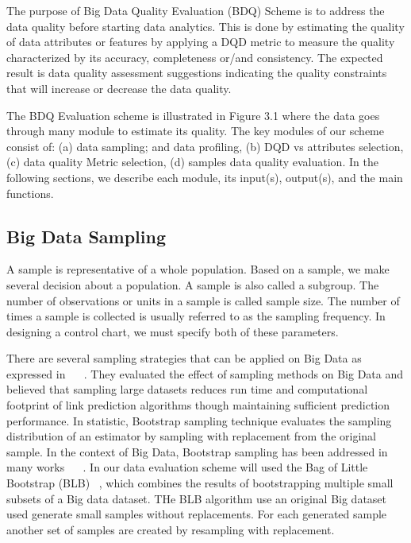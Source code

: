 The purpose of Big Data Quality Evaluation (BDQ) Scheme is to address the data quality before starting data analytics.
This is done by estimating the quality of data attributes or features by applying a DQD metric to measure the quality characterized by its
accuracy, completeness or/and consistency. The expected result is data quality assessment suggestions indicating the quality 
constraints that will increase or decrease the data quality.

The BDQ Evaluation scheme is illustrated in Figure 3.1 where the data goes through many module to estimate its quality.
The key modules of our scheme consist of: (a) data sampling; and data profiling, (b) DQD vs attributes selection, 
(c) data quality Metric selection, (d) samples data quality evaluation. In the following sections, we describe each module, its input(s), output(s),
and the main functions.

\subsection{Big Data Sampling}

A sample is representative of a whole population. Based on a sample, we make several decision about a population. 
A sample is also called a subgroup. The number of observations or units in a sample is called sample size. 
The number of times a sample is collected is usually referred to as the sampling frequency. In designing a control chart, we must 
specify both of these parameters. ~\cite{Jugulum14}

There are several sampling strategies that can be applied on Big Data as expressed in ~\cite{Asilomar} ~\cite{SIGKDD}.
They evaluated the effect of sampling methods on Big Data and believed that sampling large datasets reduces run time and computational footprint of link 
prediction algorithms though maintaining sufficient prediction performance. In statistic, Bootstrap sampling technique evaluates the sampling distribution of an 
estimator by sampling with replacement from the original sample. In the context of Big Data, Bootstrap sampling has been addressed in many works 
~\cite{Liang2016} ~\cite{Satyanarayana2014}. 
In our data evaluation scheme will used the Bag of Little Bootstrap (BLB) ~\cite{ArXiv12066415}, which combines the results of bootstrapping multiple small subsets of a 
Big data dataset. THe BLB algorithm use an original Big dataset used generate small samples without replacements. 
For each generated sample another set of samples are created by resampling with replacement.

